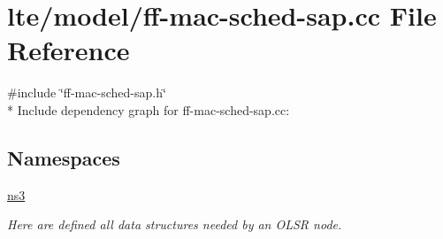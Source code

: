 \hypertarget{ff-mac-sched-sap_8cc}{}\section{lte/model/ff-\/mac-\/sched-\/sap.cc File Reference}
\label{ff-mac-sched-sap_8cc}
{\ttfamily \#include \char`\"{}ff-\/mac-\/sched-\/sap.\+h\char`\"{}}\\*
Include dependency graph for ff-\/mac-\/sched-\/sap.cc\+:
\subsection*{Namespaces}
\begin{DoxyCompactItemize}
\item 
 \hyperlink{namespacens3}{ns3}
\begin{DoxyCompactList}\small\item\em Here are defined all data structures needed by an O\+L\+SR node. \end{DoxyCompactList}\end{DoxyCompactItemize}
